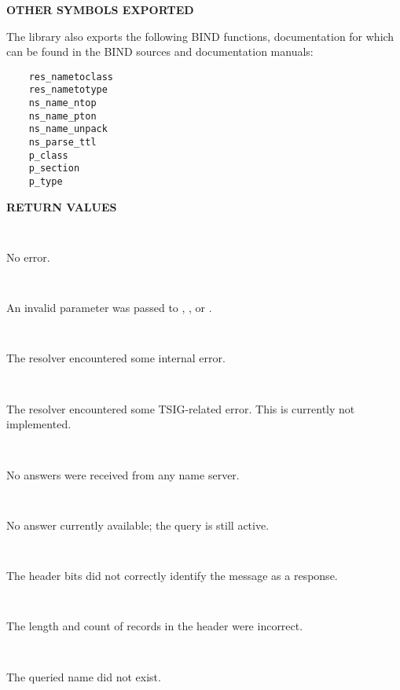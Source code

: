 {\bf OTHER SYMBOLS EXPORTED}

The  library also exports the following BIND functions,
documentation for which can be found in the BIND sources and documentation
manuals:
\begin{verbatim}
    res_nametoclass
    res_nametotype
    ns_name_ntop
    ns_name_pton
    ns_name_unpack
    ns_parse_ttl
    p_class
    p_section
    p_type
\end{verbatim}

{\bf RETURN VALUES}

\begin{description}

\item {}\verb" "

No error.

\item {}\verb" "

An invalid parameter was passed to , , or
.

\item {}\verb" "

The resolver encountered some internal error.

\item {}\verb" "

The resolver encountered some TSIG-related error.  This is currently
not implemented.

\item {}\verb" "

No answers were received from any name server.

\item {}\verb" "

No answer currently available; the query is still active.

\item {}\verb" "

The header bits did not correctly identify the message as a response.

\item {}\verb" "

The length and count of records in the header were incorrect.

\item {}\verb" "

The queried name did not exist.


\end{description}
